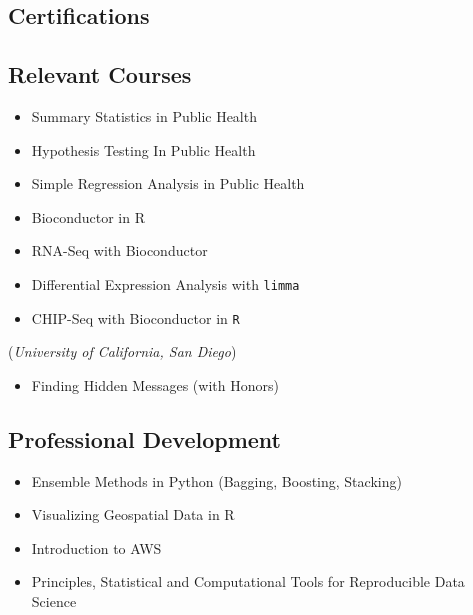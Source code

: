 \documentclass[11pt,a4paper,sans]{moderncv}
\begin{document}
\subsection{Certifications}

\subsection{Relevant Courses}
\begin{itemize}
	\item Summary Statistics in Public Health
	\item Hypothesis Testing In Public Health
	\item Simple Regression Analysis in Public Health
\end{itemize}
\begin{itemize}
	\item Bioconductor in R
	\item RNA-Seq with Bioconductor
	\item Differential Expression Analysis with \texttt{limma}
	\item CHIP-Seq with Bioconductor in \texttt{R}
\end{itemize}  
(\textit{University of California, San Diego}) 
\begin{itemize}
	\item Finding Hidden Messages (with Honors)
\end{itemize}





\subsection{Professional Development}
\begin{itemize}
	\item Ensemble Methods in Python (Bagging, Boosting, Stacking)
	\item Visualizing Geospatial Data in R
	\item Introduction to AWS
	\item Principles, Statistical and Computational Tools for Reproducible Data Science
\end{itemize}
\end{document}
